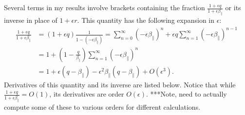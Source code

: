 \documentclass{article}
\newcommand{\para}{\parallel}
\newcommand{\ep}{\epsilon}
\newcommand{\fr}{\frac{1+\ep q}{1+\ep\beta_\para}}
\newcommand{\pth} [1] {\left( #1 \right) }
\begin{document}
Several terms in my results involve brackets containing the fraction $\fr$ or its inverse in place of $1+\ep r$. This quantity has the following expansion in $\ep$:
\begin{align*}
    \fr &= (1+\ep q) \frac{1}{1-\pth{-\ep\beta_\para}} = \sum^\infty_{n=0} \pth{-\ep\beta_\para}^n + \ep q\sum^\infty_{n=1} \pth{-\ep\beta_\para}^{n-1} \\ 
    &= 1 + \pth{1 - \frac{q}{\beta_\para}} \sum^\infty_{n=1} \pth{-\ep\beta_\para}^n \\ 
    &= 1 + \ep\pth{q-\beta_\para} - \ep^2 \beta_\para \pth{q-\beta_\para} + O\pth{\ep^3}.
\end{align*}
Derivatives of this quantity and its inverse are listed below. Notice that while $\fr = O(1)$, its derivatives are order $O(\ep)$. ***Note, need to actually compute some of these to various orders for different calculations. 
\end{document}
